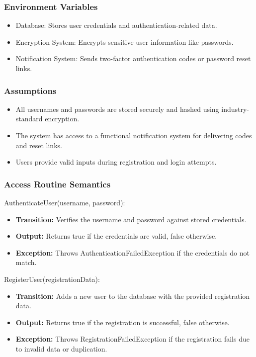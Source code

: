 \documentclass[12pt, titlepage]{article}
\begin{document}
\subsubsection{Environment Variables}

\begin{itemize}
  \item Database: Stores user credentials and authentication-related data.
  \item Encryption System: Encrypts sensitive user information like passwords.
  \item Notification System: Sends two-factor authentication codes or password reset links.
\end{itemize}

\subsubsection{Assumptions}

\begin{itemize}
  \item All usernames and passwords are stored securely and hashed using industry-standard encryption.
  \item The system has access to a functional notification system for delivering codes and reset links.
  \item Users provide valid inputs during registration and login attempts.
\end{itemize}

\subsubsection{Access Routine Semantics}

\noindent AuthenticateUser(username, password):
\begin{itemize}
  \item \textbf{Transition:} Verifies the username and password against stored credentials.
  \item \textbf{Output:} Returns true if the credentials are valid, false otherwise.
  \item \textbf{Exception:} Throws AuthenticationFailedException if the credentials do not match.
\end{itemize}

\noindent RegisterUser(registrationData):
\begin{itemize}
  \item \textbf{Transition:} Adds a new user to the database with the provided registration data.
  \item \textbf{Output:} Returns true if the registration is successful, false otherwise.
  \item \textbf{Exception:} Throws RegistrationFailedException if the registration fails due to invalid data or duplication.
\end{itemize}
\end{document}
